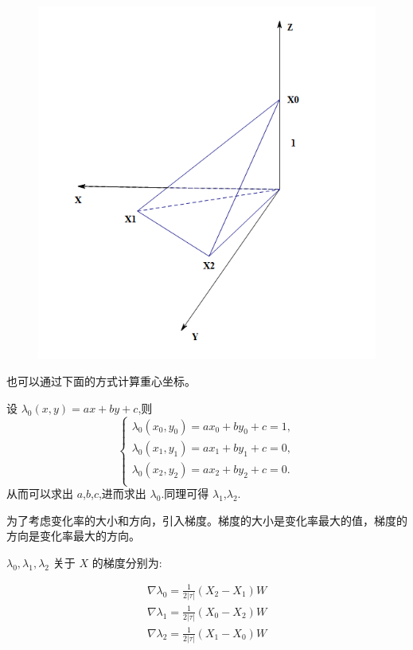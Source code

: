 \documentclass[12pt,a4paper]{article}
\begin{document}
\begin{figure}[H]
\centering
\includegraphics[scale=0.7]{./figures/3.png}
\caption{}
\end{figure}

也可以通过下面的方式计算重心坐标。

设 $\lambda_0 (x,y)=ax+by+c$,则
$$
\begin{cases}
\lambda _0 (x_0,y_0)=ax_0+by_0+c=1,\\
\lambda _0 (x_1,y_1)=ax_1+by_1+c=0,\\
\lambda _0 (x_2,y_2)=ax_2+by_2+c=0.\\
\end{cases}
$$
从而可以求出 $a$,$b$,$c$,进而求出 $\lambda _0$.同理可得 $\lambda _1$,$\lambda _2$.

为了考虑变化率的大小和方向，引入梯度。梯度的大小是变化率最大的值，梯度的方向是变化率最大的方向。

$\lambda_0, \lambda_1, \lambda_2$ 关于 $X$ 的梯度分别为:

$$
\begin{aligned}
\nabla\lambda_0 = \frac{1}{2|\tau|}(X_2 - X_1)W\\
\nabla\lambda_1 = \frac{1}{2|\tau|}(X_0 - X_2)W\\
\nabla\lambda_2 = \frac{1}{2|\tau|}(X_1 - X_0)W\\
\end{aligned}
$$
\end{document}
